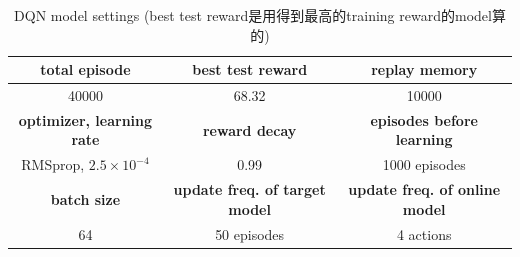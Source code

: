\documentclass[12pt, a4paper]{article}
\begin{document}
\begin{CJK}{UTF8}{bkai}
\begin{table}[!htb]
\centering
\begin{tabular}{|c|c|c|}
\hline
{\textbf{total episode}} & {\textbf{best test reward}} & \textbf{replay memory} \\
\hline
{40000} & {68.32} & {10000} \\
\hline
\hline
{\textbf{optimizer, learning rate}} & {\textbf{reward decay}} & \textbf{episodes before learning} \\
\hline
{RMSprop, $2.5 \times 10^{-4}$} & {0.99} & {1000 episodes}\\
\hline
\hline
\textbf{batch size} & \textbf{update freq. of target model} & \textbf{update freq. of online model}\\
\hline
{64} & {50 episodes} & {4 actions}\\
\hline

\end{tabular} 
\caption{DQN model settings (best test reward是用得到最高的training reward的model算的)}
\label{table:2}
\end{table}


\end{CJK}
\end{document}
